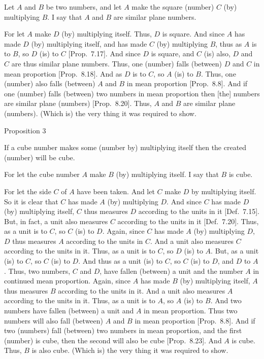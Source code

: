 Let $A$ and $B$ be two numbers, and let $A$ make the square (number)
$C$ (by) multiplying $B$. I say that $A$ and $B$ are similar plane numbers.

For let $A$ make $D$ (by) multiplying itself. Thus, $D$ is square. And since $A$ has made $D$ (by) multiplying itself, and has made $C$ (by)
multiplying $B$, thus as $A$ is to $B$, so $D$ (is) to $C$ [Prop.~7.17]. And since $D$ is  square, and $C$ (is) also, $D$ and $C$ are thus similar plane numbers. Thus, 
one (number) falls (between) $D$ and $C$ in mean proportion [Prop.~8.18]. And as $D$ is to $C$, so $A$ (is) to $B$. Thus, one (number) also falls (between) $A$ and $B$ in mean proportion [Prop.~8.8].  And if one (number)
falls (between) two numbers in mean proportion then [the] numbers
are similar plane (numbers)  [Prop.~8.20].
Thus, $A$ and $B$ are similar plane (numbers). (Which is) the
very thing it was required to show.


\begin{center}
{\large Proposition 3}
\end{center}

If a cube number makes some (number by) multiplying itself then the created (number) will be cube.

\epsfysize=1.2in
\centerline{}

For let the cube number $A$ make $B$ (by) multiplying itself. I say
that $B$ is  cube.

For let the side $C$ of $A$ have been taken. And let $C$ make
$D$ by multiplying itself. So it is clear that $C$ has made $A$ (by)
multiplying $D$. And since $C$ has made $D$ (by) multiplying itself,
$C$ thus measures $D$ according to the units in it [Def.~7.15]. But, in fact, a unit also measures
$C$ according to the units in it [Def.~7.20]. 
Thus, as a unit is to $C$, so $C$ (is) to $D$. Again, since $C$ has
made $A$ (by) multiplying $D$, $D$ thus measures $A$ according to
the units in $C$. And a unit also measures $C$ according to the units in it. Thus, as a unit is to $C$, so $D$ (is) to $A$. But, as a unit (is) to $C$, so
$C$ (is) to $D$. And thus as a unit (is) to $C$, so $C$ (is) to $D$, and
$D$ to $A$. Thus, two numbers, $C$ and $D$, have fallen (between) a unit
and the number $A$ in continued  mean proportion. Again, since $A$ has made $B$ (by) multiplying itself, $A$ thus measures $B$ according to the units in it.
And a unit also measures $A$ according to the units in it. Thus, as a
unit is to $A$, so $A$ (is) to $B$. And two numbers have
fallen (between) a unit and $A$ in mean proportion. Thus two
numbers will also fall (between) $A$ and $B$ in mean proportion [Prop.~8.8].
And if two
(numbers) fall (between) two numbers in mean proportion, and the
first (number) is cube, then the second will also be  cube 
[Prop.~8.23]. And $A$ is cube.
Thus, $B$ is also  cube. (Which is) the very thing it was required to show.


